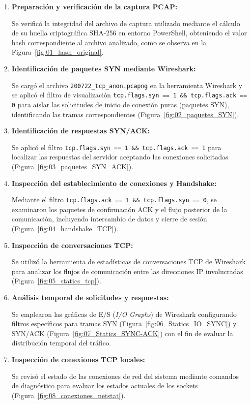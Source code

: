 \begin{enumerate}
    \item \textbf{Preparación y verificación de la captura PCAP:} \par Se verificó la integridad del archivo de captura utilizado mediante el cálculo de su huella criptográfica SHA-256 en entorno PowerShell, obteniendo el valor hash correspondiente al archivo analizado, como se observa en la Figura~\ref{fig:01_hash_original}.
    \item \textbf{Identificación de paquetes SYN mediante Wireshark:} \par Se cargó el archivo \texttt{200722\_tcp\_anon.pcapng} en la herramienta Wireshark y se aplicó el filtro de visualización \texttt{tcp.flags.syn == 1 \&\& tcp.flags.ack == 0} para aislar las solicitudes de inicio de conexión puras (paquetes SYN), identificando las tramas correspondientes (Figura~\ref{fig:02_paquetes_SYN}).
    \item \textbf{Identificación de respuestas SYN/ACK:} \par Se aplicó el filtro \texttt{tcp.flags.syn == 1 \&\& tcp.flags.ack == 1} para localizar las respuestas del servidor aceptando las conexiones solicitadas (Figura~\ref{fig:03_paquetes_SYN_ACK}).
    \item \textbf{Inspección del establecimiento de conexiones y Handshake:} \par Mediante el filtro \texttt{tcp.flags.ack == 1 \&\& tcp.flags.syn == 0}, se examinaron los paquetes de confirmación ACK y el flujo posterior de la comunicación, incluyendo intercambio de datos y cierre de sesión (Figura~\ref{fig:04_handshake_TCP}).
    \item \textbf{Inspección de conversaciones TCP:} \par Se utilizó la herramienta de estadísticas de conversaciones TCP de Wireshark para analizar los flujos de comunicación entre las direcciones IP involucradas (Figura~\ref{fig:05_statics_tcp}).
    \item \textbf{Análisis temporal de solicitudes y respuestas:} \par Se emplearon las gráficas de E/S (\textit{I/O Graphs}) de Wireshark configurando filtros específicos para tramas SYN (Figura~\ref{fig:06_Statics_IO_SYNC}) y SYN/ACK (Figura~\ref{fig:07_Statics_SYNC-ACK}) con el fin de evaluar la distribución temporal del tráfico.
    \item \textbf{Inspección de conexiones TCP locales:} \par Se revisó el estado de las conexiones de red del sistema mediante comandos de diagnóstico para evaluar los estados actuales de los sockets (Figura~\ref{fig:08_conexiones_netstat}).
\end{enumerate}

